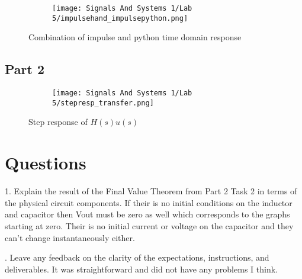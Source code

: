 \documentclass[12pt,a4paper]{article}
\begin{document}
\begin{figure}[h]
\centering
\begin{subfigure}{ 1\textwidth}
\texttt{[image: Signals And Systems 1/Lab 5/impulsehand\_impulsepython.png]}
\end{subfigure}
\caption{ Combination of impulse and python time domain response}
\label{fig2:image22}
\end{figure}



\subsection{Part 2}

\begin{figure}[h]
\centering
\begin{subfigure}{ 1\textwidth}
\texttt{[image: Signals And Systems 1/Lab 5/stepresp\_transfer.png]}
\end{subfigure}
\caption{  Step response of $H(s)u(s)$ }
\label{fig2:image22}
\end{figure}



\section{Questions}\label{sec:res}


1. Explain the result of the Final Value Theorem from Part 2 Task 2 in terms of the physical
circuit components.\newline
If their is no initial conditions on the inductor and capacitor then Vout must be zero as well which corresponds to the graphs starting at zero. Their is no initial current or voltage on the capacitor and they can't change instantaneously either. 

. Leave any feedback on the clarity of the expectations, instructions, and deliverables.\newline
\noindent It was straightforward and did not have any problems I think.










\end{document}

